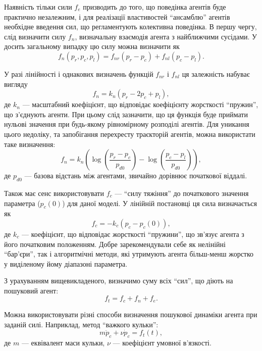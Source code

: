 \documentclass[a4paper,13pt]{atuaref}
\begin{document}
Наявність тільки сили $ f_e $ призводить до того, що поведінка агентів буде
практично незалежним, і для реалізації властивостей ``ансамблю'' агентів
необхідне введення сил, що регламентують колективна поведінка. В першу чергу,
слід визначити силу $f_n$, визначальну взаємодія агента з найближчими
сусідами. У досить загальному випадку цю силу можна визначити як
%
\begin{equation}
  f_n( p_r, p_c, p_l ) = f_{nr}(p_r-p_c) + f_{nl}(p_c-p_l).
  \label{atu:eq:f_n_gen}
\end{equation}

У разі лінійності і однакових визначень функцій $ f_ {nr} $ і $ f_ {nl} $ ця залежність набуває вигляду
%
\begin{equation}
  f_n = k_n ( p_r - 2 p_c + p_l ),
  \label{atu:eq:f_n_lin}
\end{equation}
%
де $ k_n $ --- масштабний коефіцієнт, що відповідає коефіцієнту жорсткості
``пружин'', що з'єднують агенти. При цьому слід зазначити, що ця функція буде
приймати нульові значення при будь-якому рівномірному розподілі агентів.
Для уникання цього недоліку, та запобігання перехресту траєкторій агентів,
можна використати таке визначення:
%
\begin{equation}
  f_n = k_n \left( \log\left( \frac{p_r-p_c}{p_{d0}} \right) -  \log\left( \frac{p_c-p_l}{p_{d0}}\right) \right),
  \label{atu:eq:f_n_log}
\end{equation}
%
де
$p_{d0}$ ---
базова відстань між агентами, звичайно дорівнює початкової віддалі.

Також має сенс використовувати $f_c$ --- ``силу тяжіння'' до початкового значення параметра
($ p_{c}(0) $) для даної моделі. У лінійній постановці ця сила визначається як
%
\begin{equation}
  f_c = -k_c (p_c - p_{c}(0)) ,
  \label{atu:eq:f_c}
\end{equation}
%
де $k_c$ --- коефіцієнт, що відповідає жорсткості ``пружини'',
що зв'язує агента з його початковим положенням.
Добре зарекомендували себе як нелінійні ``бар'єри'',
так і алгоритмічні методи, які утримують агента
більш-менш жорстко у виділеному йому діапазоні параметра.

З урахуванням вищевикладеного, визначимо суму всіх ``сил'',
що діють на пошуковий агент:
\begin{equation}
  f_t = f_c + f_n + f_e .
  \label{atu:eq:f_t}
\end{equation}


Можна використовувати різні способи визначення пошукової динаміки агента при
заданій силі. Наприклад, метод ``важкого кульки'':
\begin{equation}
  m \ddot{p}_c + \nu \dot{p}_c = f_t(t),
  \label{atu:eq:heavy_ball}
\end{equation}
%
де $ m $ --- еквівалент маси кульки, $\nu$ --- коефіцієнт умовної в'язкості.
\end{document}
